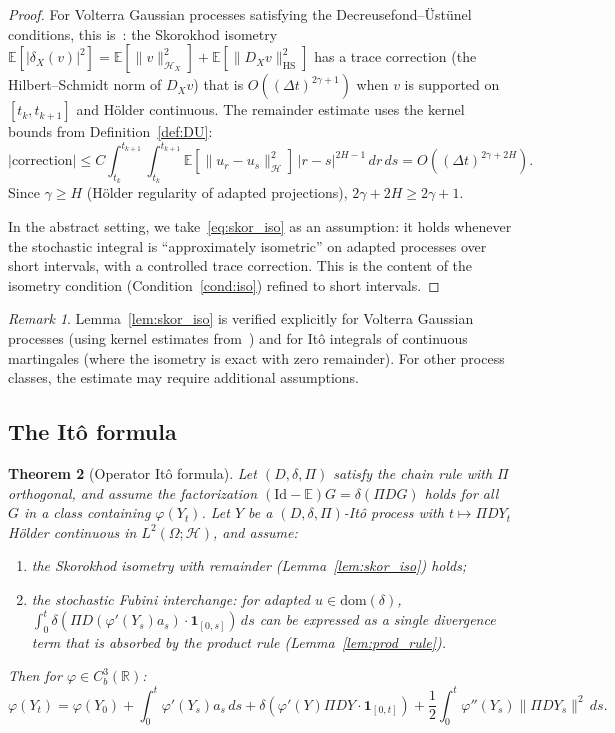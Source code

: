 \documentclass[11pt,a4paper]{article}
\theoremstyle{plain}
\newtheorem{theorem}{Theorem}[section]
\theoremstyle{definition}
\theoremstyle{remark}
\newtheorem{remark}[theorem]{Remark}
\newcommand{\E}{\mathbb{E}}
\newcommand{\R}{\mathbb{R}}
\newcommand{\Id}{\mathrm{Id}}
\newcommand{\dom}{\mathrm{dom}}
\newcommand{\HX}{\mathcal{H}_X}
\begin{document}
\begin{proof}
For Volterra Gaussian processes satisfying the Decreusefond--\"Ust\"unel conditions, this is~\cite[Proposition 1.3.5]{Decreusefond1999}: the Skorokhod isometry $\E[|\delta_X(v)|^2] = \E[\|v\|^2_{\HX}] + \E[\|D_Xv\|^2_{\text{HS}}]$ has a trace correction (the Hilbert--Schmidt norm of $D_Xv$) that is $O((\Delta t)^{2\gamma+1})$ when $v$ is supported on $[t_k,t_{k+1}]$ and H\"older continuous. The remainder estimate uses the kernel bounds from Definition~\ref{def:DU}:
\[
|\text{correction}| \le C\int_{t_k}^{t_{k+1}}\int_{t_k}^{t_{k+1}} \E[\|u_r-u_s\|^2_{\mathcal{H}}]\,|r-s|^{2H-1}\,dr\,ds = O((\Delta t)^{2\gamma+2H}).
\]
Since $\gamma \ge H$ (H\"older regularity of adapted projections), $2\gamma+2H \ge 2\gamma+1$.

In the abstract setting, we take~\eqref{eq:skor_iso} as an assumption: it holds whenever the stochastic integral is ``approximately isometric'' on adapted processes over short intervals, with a controlled trace correction. This is the content of the isometry condition (Condition~\ref{cond:iso}) refined to short intervals.
\end{proof}

\begin{remark}\label{rem:skor_scope}
Lemma~\ref{lem:skor_iso} is verified explicitly for Volterra Gaussian processes (using kernel estimates from~\cite{Decreusefond1999}) and for It\^o integrals of continuous martingales (where the isometry is exact with zero remainder). For other process classes, the estimate may require additional assumptions.
\end{remark}


\subsection{The It\^o formula}

\begin{theorem}[Operator It\^o formula]\label{thm:ito}
Let $(D,\delta,\Pi)$ satisfy the chain rule with $\Pi$ orthogonal, and assume the factorization $(\Id - \E)G = \delta(\Pi DG)$ holds for all $G$ in a class containing $\varphi(Y_t)$. Let $Y$ be a $(D,\delta,\Pi)$-It\^o process with $t\mapsto\Pi DY_t$ H\"older continuous in $L^2(\Omega;\mathcal{H})$, and assume:
\begin{enumerate}[label=\textup{(\roman*)}]
\item the Skorokhod isometry with remainder (Lemma~\ref{lem:skor_iso}) holds;
\item the stochastic Fubini interchange: for adapted $u \in \dom(\delta)$, $\int_0^t\delta(\Pi D(\varphi'(Y_s)a_s)\cdot\mathbf{1}_{[0,s]})\,ds$ can be expressed as a single divergence term that is absorbed by the product rule (Lemma~\ref{lem:prod_rule}).
\end{enumerate}
Then for $\varphi \in C_b^3(\R)$:
\begin{equation}\label{eq:ito}
\varphi(Y_t) = \varphi(Y_0)+\int_0^t\varphi'(Y_s)a_s\,ds+\delta(\varphi'(Y)\Pi DY\cdot\mathbf{1}_{[0,t]})+\frac{1}{2}\int_0^t\varphi''(Y_s)\|\Pi DY_s\|^2\,ds.
\end{equation}
\end{theorem}
\end{document}
